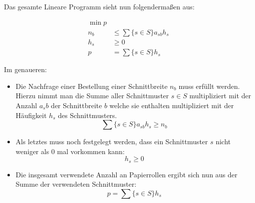 Das gesamte Lineare Programm sieht nun folgendermaßen aus:
 
\begin{align*}
\min p & \\
 n_b  & \leq \sum\{s \in S\}a_{sb} h_s\\
h_s & \geq 0 \\
p & = \sum\{s \in S\}h_s 
\end{align*}

Im genaueren:

\begin{itemize}
\item Die Nachfrage einer Bestellung einer Schnittbreite $n_b$ muss erfüllt werden. Hierzu nimmt man die Summe aller Schnittmuster $s \in S$ multipliziert mit der Anzahl $a_sb$ der Schnittbreite $b$ welche sie enthalten multipliziert mit der Häufigkeit $h_s$ des Schnittmusters.
\[ \sum\{s \in S\}a_{sb} h_s \geq n_b \] 
\item Als letztes muss noch festgelegt werden, dass ein Schnittmuster $s$ nicht weniger als 0 mal vorkommen kann:
\[ h_s \geq 0 \]
\item Die insgesamt verwendete Anzahl an Papierrollen ergibt sich nun aus der Summe der verwendeten Schnittmuster:
\[ p = \sum\{s \in S\}h_s \]
\end{itemize}
 

